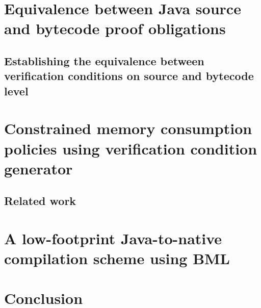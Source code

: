 \documentclass[10pt,a4paper]{book}
\begin{document}
\chapter{Equivalence between Java source and bytecode proof obligations}\label{pogEquiv}
  
  
   
  
    
 \section{Establishing the equivalence between verification conditions on source and bytecode level} \label{pog:wpBcGeneral}
    
    
 

\chapter{Constrained memory consumption policies using verification condition generator}\label{applications:memory}
  
  \lstset{numbers=none}

  \label{sec:verif}
     
  
  
  
  \section{Related work}\label{sec:rel}
  


\chapter{A low-footprint Java-to-native compilation scheme using BML}\label{applications:optimComp}
  \lstset{frameround=tttt}
  
  
  
  
  
  
   
   
  
  
 


 \chapter{Conclusion}\label{conclusion}
 



\appendix
  \label{BMLencode}
  \label{pogProofs}
    

 
\printindex 


\end{document}
